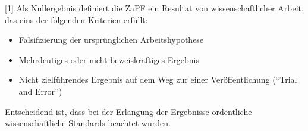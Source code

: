 \documentclass[DIV=12]{scrartcl}
\begin{document}
[1] Als Nullergebnis definiert die ZaPF ein Resultat von wissenschaftlicher Arbeit, das eins der folgenden Kriterien erfüllt:
\begin{itemize}
\item Falsifizierung der ursprünglichen Arbeitshypothese
\item Mehrdeutiges oder nicht beweiskräftiges Ergebnis
\item Nicht zielführendes Ergebnis auf dem Weg zur einer Veröffentlichung (\enquote{Trial and Error})
\end{itemize}
Entscheidend ist, dass bei der Erlangung der Ergebnisse ordentliche wissenschaftliche Standards beachtet wurden. 
\end{document}
